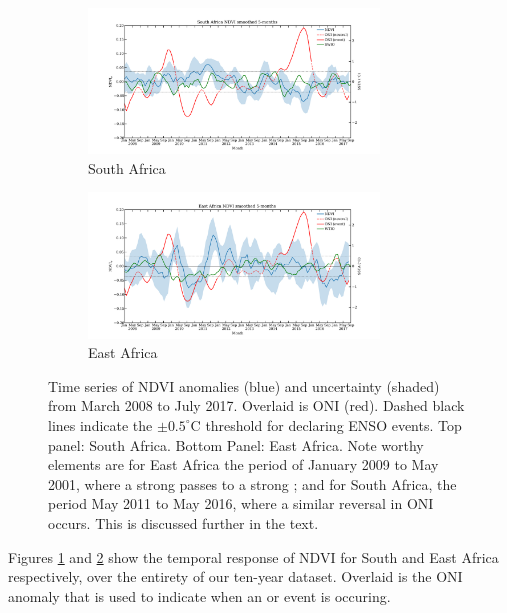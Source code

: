 \begin{figure}
  \centering
  \begin{subfigure}{\textwidth}
    \centering
    \includegraphics[width=0.85\textwidth]{figures/ndvi_oni_io_capetown_smoothed_5.pdf}
    \caption{South Africa}
    \label{fig:ndvi_t_south}
  \end{subfigure}
  \begin{subfigure}{\textwidth}
    \centering
    \includegraphics[width=0.85\textwidth]{figures/ndvi_oni_io_eastafrica_smoothed_5.pdf}
    \caption{East Africa}
    \label{fig:ndvi_t_east}
    \end{subfigure}
  \caption{Time series of NDVI anomalies (blue) and uncertainty
    (shaded) from March 2008 to July 2017. Overlaid is ONI
    (red). Dashed black lines indicate the $\pm0.5^{\circ}$C threshold
    for declaring ENSO events. Top panel: South Africa. Bottom Panel:
    East Africa. Note worthy elements are for East Africa the period
    of January 2009 to May 2001, where a strong \elnino{} passes to a
    strong \nina{}; and for South Africa, the period May 2011 to May
    2016, where a similar reversal in ONI occurs. This is discussed
    further in the text.}
  \label{fig:ndvi_temporal}
\end{figure}

Figures \ref{fig:ndvi_t_south} and \ref{fig:ndvi_t_east} show the
temporal response of NDVI for South and East Africa respectively, over
the entirety of our ten-year dataset. Overlaid is the ONI anomaly that
is used to indicate when an \elnino{} or \nina{} event is occuring.


